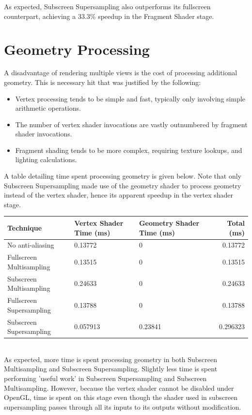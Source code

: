 \documentclass[12pt,a4paper,twoside,openright]{report}
\begin{document}
As expected, Subscreen Supersampling also outperforms its fullscreen counterpart, achieving a 33.3\% speedup in the Fragment Shader stage. 

\section{Geometry Processing}

A disadvantage of rendering multiple views is the cost of processing additional geometry. This is necessary hit that was justified by the following:

\begin{itemize}
\item Vertex processing tends to be simple and fast, typically only involving simple arithmetic operations.
\item The number of vertex shader invocations are vastly outnumbered by fragment shader invocations. 
\item Fragment shading tends to be more complex, requiring texture lookups, and lighting calculations.
\end{itemize}

A table detailing time spent processing geometry is given below. Note that only Subscreen Supersampling made use of the geometry shader to process geometry instead of the vertex shader, hence its apparent speedup in the vertex shader stage.  

\begin{tabular}{l|b{2.8cm}|b{3.5cm}|r}
Technique   & Vertex Shader Time (ms) & Geometry Shader Time (ms) & Total (ms) \\ 
\hline
No anti-aliasing      & 0.13772 & 0 & 0.13772 \\
Fullscreen Multisampling     & 0.13515 & 0 & 0.13515 \\
Subscreen Multisampling    &  0.24633 & 0 & 0.24633 \\
Fullscreen Supersampling      & 0.13788 & 0 & 0.13788 \\
Subscreen Supersampling    & 0.057913  & 0.23841 & 0.296323 \\
\end{tabular} \\

As expected, more time is spent processing geometry in both Subscreen Multisampling and Subscreen Supersampling. Slightly less time is spent performing 'useful work' in Subscreen Supersampling and Subscreen Multisampling. However, because the vertex shader cannot be disabled under OpenGL, time is spent on this stage even though the shader used in subscreen supersampling passes through all its inputs to its outputs without modification.  
\end{document}
